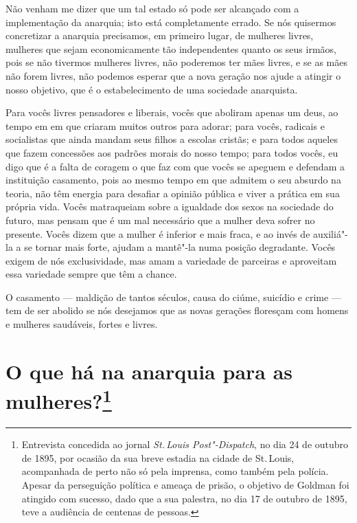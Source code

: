 Não venham me dizer que um tal estado só pode ser alcançado com a
implementação da anarquia; isto está completamente errado. Se nós
quisermos concretizar a anarquia precisamos, em primeiro lugar, de mulheres livres, mulheres que sejam economicamente tão
independentes quanto os seus irmãos, pois se não tivermos mulheres
livres, não poderemos ter mães livres, e se as mães não forem livres,
não podemos esperar que a nova geração nos ajude a atingir o nosso
objetivo, que é o estabelecimento de uma sociedade anarquista.

Para vocês livres pensadores e liberais, vocês que aboliram apenas um deus, ao tempo em em que criaram muitos outros para adorar; para vocês, radicais e
socialistas que ainda mandam seus filhos a escolas cristãs; e para
todos aqueles que fazem concessões aos padrões morais do nosso tempo;
para todos vocês, eu digo que é a falta de coragem o que faz com que
vocês se apeguem e defendam a instituição casamento, pois ao mesmo tempo
em que admitem o seu absurdo na teoria, não têm energia para
desafiar a opinião pública e viver a prática em sua própria vida. Vocês
matraqueiam sobre a igualdade dos sexos na sociedade do futuro, mas
pensam que é um mal necessário que a mulher deva sofrer no presente.
Vocês dizem que a mulher é inferior e mais fraca, e ao invés de
auxiliá"-la a se tornar mais forte, ajudam a mantê"-la numa posição
degradante. Vocês exigem de nós exclusividade, mas amam a variedade de
parceiras e aproveitam essa variedade sempre que têm a chance.

O casamento --- maldição de tantos séculos, causa do ciúme, suicídio e
crime --- tem de ser abolido se nós desejamos que as novas gerações
floresçam com homens e mulheres saudáveis, fortes e livres.

\chapter{O que há na anarquia para as mulheres?\footnote[*]{Entrevista concedida
  ao jornal \emph{St.\,Louis Post"-Dispatch}, no dia 24 de outubro de 1895, por
  ocasião da sua breve estadia na cidade de St.\,Louis, acompanhada de
  perto não só pela imprensa, como também pela polícia. Apesar da
  perseguição política e ameaça de prisão, o objetivo de Goldman foi
  atingido com sucesso, dado que a sua palestra, no dia 17 de outubro de
  1895, teve a audiência de centenas de pessoas.}}


